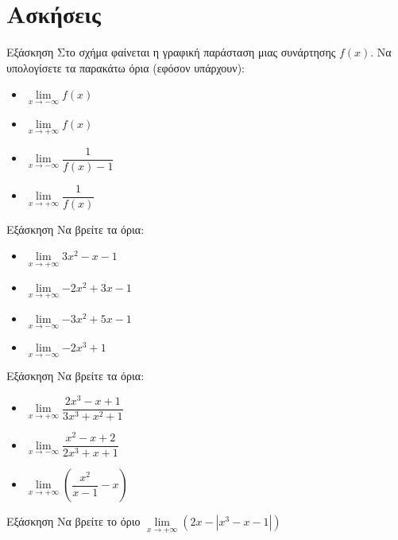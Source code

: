 \documentclass{presentation}
\begin{document}
\section{Ασκήσεις}
\begin{frame}{Εξάσκηση}
      Στο σχήμα
      \href{https://www.geogebra.org/m/p9xmedm8}{}
      φαίνεται η γραφική παράσταση μιας συνάρτησης $f(x)$. Να υπολογίσετε τα παρακάτω όρια (εφόσον υπάρχουν):
      \begin{itemize}
            \item $\lim\limits_{x \to -\infty}{ f(x) }$ \pause
            \item $\lim\limits_{x \to +\infty}{ f(x) }$ \pause
            \item $\lim\limits_{x \to -\infty}{ \dfrac{1}{f(x)-1} }$ \pause
            \item $\lim\limits_{x \to +\infty}{ \dfrac{1}{f(x)} }$
      \end{itemize}
\end{frame}

\begin{frame}{Εξάσκηση}
      Να βρείτε τα όρια:
      \begin{itemize}
            \item $\lim\limits_{x \to +\infty}{ 3x^2-x-1 }$ \pause
            \item $\lim\limits_{x \to +\infty}{ -2x^2+3x-1 }$ \pause
            \item $\lim\limits_{x \to -\infty}{ -3x^2+5x-1 }$ \pause
            \item $\lim\limits_{x \to -\infty}{ -2x^3+1 }$
      \end{itemize}
\end{frame}

\begin{frame}{Εξάσκηση}
      Να βρείτε τα όρια:
      \begin{itemize}
            \item $\lim\limits_{x \to +\infty}{ \dfrac{2x^3-x+1}{3x^3+x^2+1} }$ \pause
            \item $\lim\limits_{x \to -\infty}{ \dfrac{x^2-x+2}{2x^3+x+1} }$ \pause
            \item $\lim\limits_{x \to +\infty}{ \left( \dfrac{x^2}{x-1}-x  \right)  }$
      \end{itemize}
\end{frame}

\begin{frame}{Εξάσκηση}
      Να βρείτε το όριο $\lim\limits_{x \to +\infty}{ \left( 2x-|x^3-x-1| \right)  }$
\end{frame}
\end{document}
